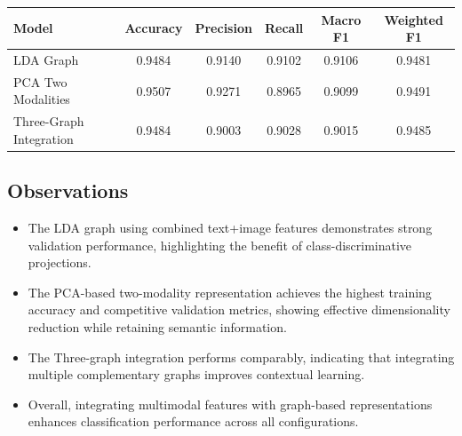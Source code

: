 \documentclass[a4paper]{cas-sc}
\begin{document}
\vspace{1em}

\begin{center}
\begin{minipage}{\linewidth}
\centering
\begin{tabular}{lccccc}
\hline
Model & Accuracy & Precision & Recall & Macro F1 & Weighted F1 \\
\hline
LDA Graph & 0.9484 & 0.9140 & 0.9102 & 0.9106 & 0.9481 \\
PCA Two Modalities & 0.9507 & 0.9271 & 0.8965 & 0.9099 & 0.9491 \\
Three-Graph Integration & 0.9484 & 0.9003 & 0.9028 & 0.9015 & 0.9485 \\
\hline
\end{tabular}
\label{tab:test_metrics}
\end{minipage}
\end{center}

\subsection{Observations}

\begin{itemize}
    \item The LDA graph using combined text+image features demonstrates strong validation performance, highlighting the benefit of class-discriminative projections.  
    \item The PCA-based two-modality representation achieves the highest training accuracy and competitive validation metrics, showing effective dimensionality reduction while retaining semantic information.  
    \item The Three-graph integration performs comparably, indicating that integrating multiple complementary graphs improves contextual learning.  
    \item Overall, integrating multimodal features with graph-based representations enhances classification performance across all configurations.
\end{itemize}



\end{document}
